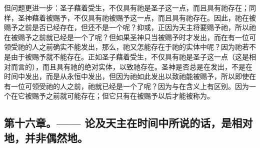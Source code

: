 但问题更进一步：圣子藉着受生，不仅具有祂是圣子这一点，而且具有祂存在；同样，圣神藉着被赐予，不仅具有祂被赐予这一点，而且具有祂存在。因此，祂在被赐予之前是否已经存在，但还不是一个呢？抑或，正因为天主将要赐予祂，所以祂在被赐予之前就已经是一个了呢？但如果圣神只当被赐予时才发出，而在有一位可领受祂的人之前确实不能发出，那么，祂又怎能存在于祂的实体中呢？因为祂若不是由于被赐予就不能存在。正如圣子藉着受生，不仅具有祂是圣子这一点（这是相对而言的），而且具有祂的绝对实体，以致祂存在。圣神是否总是在发出，不是在时间中发出，而是从永恒中发出，但因为祂如此发出以致祂能被赐予，所以即使在有一位可领受祂的人之前，祂就已经是一个了呢？因为与在含义上有区别。因为一个在它被赐予之前就可能存在；但它只有在被赐予以后才能被称为。\par


\subsection{第十六章。—— 论及天主在时间中所说的话，是相对地，并非偶然地。}

